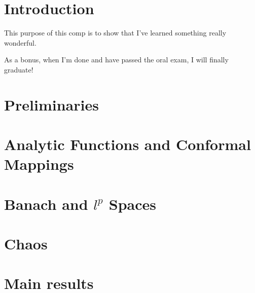 \documentclass[11pt]{article}
\theoremstyle{plain}
\theoremstyle{definition}
\begin{document}
\newpage
\doublespacing
\setcounter{page}{1}
\section{Introduction}

This purpose of this comp is to show that I've learned something really wonderful.

As a bonus, when I'm done and have passed the oral exam, I will finally graduate!

\newpage
\section{Preliminaries}


\newpage
\section{Analytic Functions and Conformal Mappings}


\newpage
\section{Banach and $l^p$ Spaces}


\newpage
\section{Chaos}


\newpage
\section{Main results}


\end{document}
